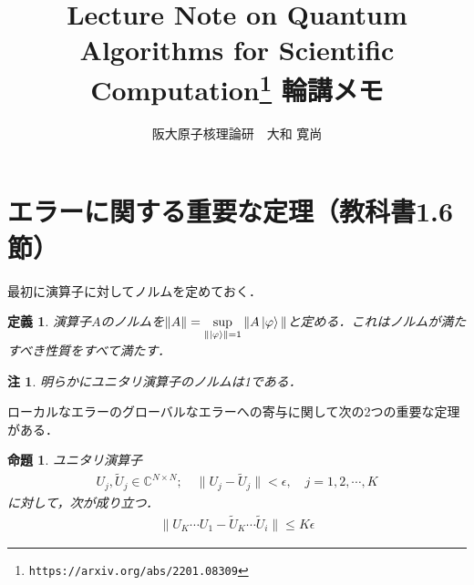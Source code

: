 \documentclass[dvipdfmx]{jarticle}
\title{{\bf Lecture Note on Quantum Algorithms for Scientific Computation\footnote{\texttt{https://arxiv.org/abs/2201.08309}} 輪講メモ}}
\author{阪大原子核理論研　大和 寛尚}
\date{}
\numberwithin{equation}{section}
\theoremstyle{seminar}
\newtheorem{definition}{定義}[section]
\newtheorem{proposition}{命題}[section]
\newtheorem{remark}{注}[section]
\begin{document}
\maketitle
\section{エラーに関する重要な定理（教科書1.6節）}
最初に演算子に対してノルムを定めておく．
\begin{definition}
  演算子$A$のノルムを${\displaystyle \| A \| = \sup_{\|\ket{\varphi}\| = 1} \| A \ket{\varphi} \|}$と定める．これはノルムが満たすべき性質をすべて満たす．
\end{definition}
\begin{remark}
  明らかにユニタリ演算子のノルムは1である．
\end{remark}
ローカルなエラーのグローバルなエラーへの寄与に関して次の2つの重要な定理がある．
\begin{proposition}
  ユニタリ演算子
  \begin{align}
    U_j, \tilde{U}_j \in \mathbb{C}^{N \times N} ; \quad \| U_j - \tilde{U}_j\| < \epsilon, \quad j = 1, 2, \cdots, K
  \end{align}
  に対して，次が成り立つ．
  \begin{align}
    \| U_K \cdots U_1 - \tilde{U}_K \cdots \tilde{U}_i \| \leq K\epsilon
  \end{align}
\end{proposition}
\end{document}
